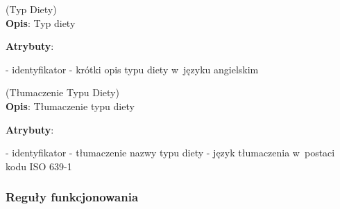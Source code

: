 \begin{enumerate}[label={\textbf{KAT/1/\protect\twodigits{\theenumi}}}, wide, labelwidth=!, labelindent=0pt, labelsep=0pt, series=reqs]
    \label{kat:DietType} (Typ Diety)\\
    \indent\textbf{Opis}: Typ diety
    \par
    \textbf{Atrybuty}:
    \begin{itemize}[series=atr, wide, align=left, leftmargin=190pt]
        \label{kat:DietType:id}- identyfikator
        \label{kat:DietType:name}- krótki opis typu diety w~języku angielskim
    \end{itemize}

    \label{kat:DietTypeTranslation} (Tłumaczenie Typu Diety)\\
    \indent\textbf{Opis}: Tłumaczenie typu diety
    \par
    \textbf{Atrybuty}:
    \begin{itemize}[series=atr, wide, align=left, leftmargin=190pt]
        \label{kat:DietTypeTranslation:id}- identyfikator
        \label{kat:DietTypeTranslation:translation}- tłumaczenie nazwy typu diety
        \label{kat:DietTypeTranslation:language}- język tłumaczenia w~postaci kodu ISO 639-1
    \end{itemize}

\end{enumerate}

\subsubsection{Reguły funkcjonowania}\label{subsubsec:database:products:functionalRules}

